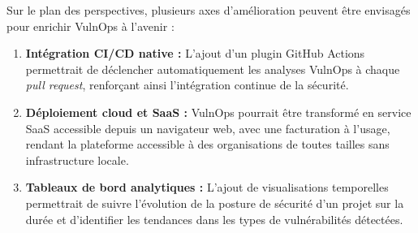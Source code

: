 \documentclass[12pt, a4paper, oneside]{report}
\begin{document}
Sur le plan des perspectives, plusieurs axes d'amélioration peuvent être envisagés
pour enrichir VulnOps à l'avenir :

\begin{enumerate}
    \item \textbf{Intégration CI/CD native :} L'ajout d'un plugin GitHub Actions
    permettrait de déclencher automatiquement les analyses VulnOps à chaque
    \textit{pull request}, renforçant ainsi l'intégration continue de la sécurité.
    
    \item \textbf{Déploiement cloud et SaaS :} VulnOps pourrait être transformé
    en service SaaS accessible depuis un navigateur web, avec une facturation
    à l'usage, rendant la plateforme accessible à des organisations de toutes
    tailles sans infrastructure locale.
    
    \item \textbf{Tableaux de bord analytiques :} L'ajout de visualisations
    temporelles permettrait de suivre l'évolution de la posture de sécurité
    d'un projet sur la durée et d'identifier les tendances dans les types
    de vulnérabilités détectées.
\end{enumerate}
\end{document}

